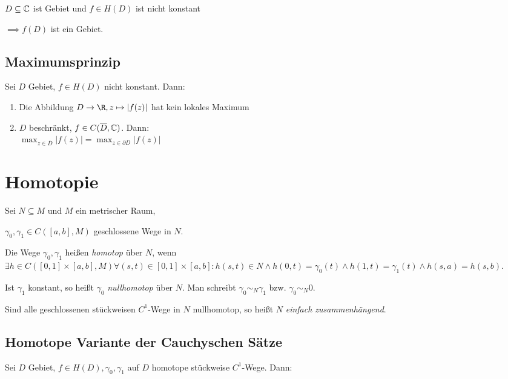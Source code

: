 $D \subseteq \mathbb{C}$ ist Gebiet und $f \in H(D)$ ist nicht konstant

$\implies f(D)$ ist ein Gebiet.

\subsection*{Maximumsprinzip}

Sei $D$ Gebiet, $f \in H(D)$ nicht konstant. Dann:

\begin{enumerate}[label=(\alph*)]
	\item Die Abbildung $D \to \R, z \mapsto |f(z)|$ hat kein lokales Maximum
	\item $D$ beschränkt, $f \in C(\overline D,\mathbb{C})$. Dann: \\ $\max_{z \in \overline D} |f(z)| = \max_{z \in \partial D} |f(z)|$
\end{enumerate}

\section*{Homotopie}

Sei $N \subseteq M$ und $M$ ein metrischer Raum,

$\gamma_0, \gamma_1 \in C([a,b],M)$ geschlossene Wege in $N$.

\vspace*{1mm}

Die Wege $\gamma_0, \gamma_1$ heißen \emph{homotop} über $N$, wenn $\exists h \in C([0,1] \times [a,b],M) \forall (s,t) \in [0,1] \times [a,b] : h(s,t) \in N \land h(0,t)=\gamma_0(t) \land h(1,t) = \gamma_1(t) \land h(s,a) = h(s,b)$.

\vspace*{1mm}

Ist $\gamma_1$ konstant, so heißt $\gamma_0$ \emph{nullhomotop} über $N$. Man schreibt $\gamma_0 \sim_N \gamma_1$ bzw. $\gamma_0 \sim_N 0$.

\vspace*{1mm}

Sind alle geschlossenen stückweisen $C^1$-Wege in $N$ nullhomotop, so heißt $N$ \emph{einfach zusammenhängend}.

\subsection*{Homotope Variante der Cauchyschen Sätze}

Sei $D$ Gebiet, $f \in H(D), \gamma_0, \gamma_1$ auf $D$ homotope stückweise $C^1$-Wege. Dann:

